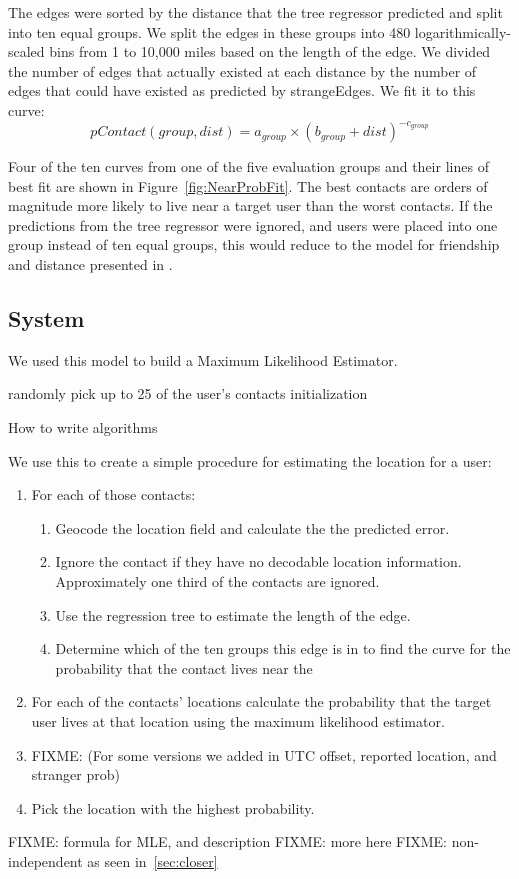The edges were sorted by the distance that the tree regressor predicted and
split into ten equal groups.
%
We split the edges in these groups into 480 logarithmically-scaled bins from 1
to 10,000 miles based on the length of the edge.
%
We divided the number of edges that actually existed at each distance by the
number of edges that could have existed as predicted by strangeEdges.
%
We fit it to this curve:
%
\[
pContact(group, dist) = a_{group} \times (b_{group}+dist)^{-c_{group}}
\]

Four of the ten curves from one of the five evaluation groups and their lines
of best fit are shown in Figure~\ref{fig:NearProbFit}.
%
The best contacts are orders of magnitude more
likely to live near a target user than the worst contacts.
%
If the predictions from the tree regressor were ignored, and users were placed
into one group instead of ten equal groups, this would reduce to the model
for friendship and distance presented in \cite{backstrom2010find}.


\subsection{System}
We used this model to build a Maximum Likelihood Estimator.

\begin{algorithm}[tbh]
  \SetAlgoLined
  randomly pick up to 25 of the user's contacts\;
  initialization\;
  \caption{How to write algorithms}
\end{algorithm}

We use this to create a simple procedure for estimating the location for a user:
\begin{enumerate}
\item For each of those contacts:
\begin{enumerate}
    \item Geocode the location field and calculate the the predicted error.
    \item Ignore the contact if they have no decodable location information.
    Approximately one third of the contacts are ignored.
    \item Use the regression tree to estimate the length of the edge.
    \item Determine which of the ten groups this edge is in to find the curve
        for the probability that the contact lives near the
\end{enumerate}
\item For each of the contacts' locations calculate the probability that the
target user lives at that location using the maximum likelihood estimator.
\item FIXME: (For some versions we added in UTC offset, reported location, and stranger prob)
\item Pick the location with the highest probability.
\end{enumerate}

FIXME: formula for MLE, and description
FIXME: more here
FIXME: non-independent as seen in~\ref{sec:closer}

